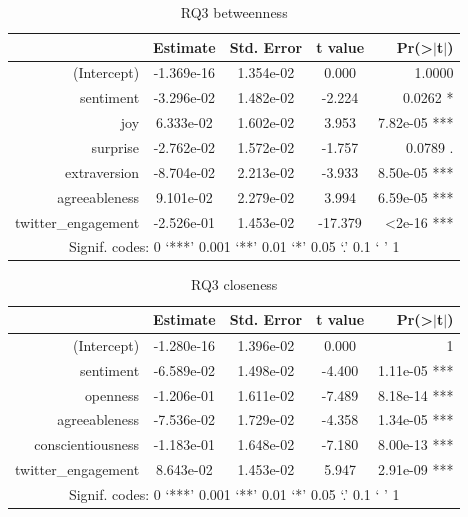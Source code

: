 \documentclass[bsc,frontabs,twoside,singlespacing,parskip,deptreport]{infthesis}
\begin{document}
\begin{table}[]
\centering
\caption{RQ3 betweenness}
\label{tab:rq3-betweenness}
\begin{tabular}{rcccr}
\hline
                    & Estimate & Std. Error     & t value & Pr(\textgreater{}$\rvert$t$\rvert$) \\ \hline
(Intercept)         & -1.369e-16    & 1.354e-02 & 0.000   & 1.0000                              \\
sentiment           & -3.296e-02    & 1.482e-02 & -2.224  & 0.0262 *                            \\
joy                 & 6.333e-02     & 1.602e-02 & 3.953   & 7.82e-05 ***                        \\
surprise            & -2.762e-02    & 1.572e-02 & -1.757  & 0.0789 .                            \\
extraversion        & -8.704e-02    & 2.213e-02 & -3.933  & 8.50e-05 ***                        \\
agreeableness       & 9.101e-02     & 2.279e-02 & 3.994   & 6.59e-05 ***                        \\
twitter\_engagement & -2.526e-01    & 1.453e-02 & -17.379 & \textless 2e-16 ***                 \\ \hline
\multicolumn{5}{c}{Signif. codes: 0 ‘***’ 0.001 ‘**’ 0.01 ‘*’ 0.05 ‘.’ 0.1 ‘ ’ 1}               \\ \hline
\end{tabular}
\end{table}

\begin{table}[]
\centering
\caption{RQ3 closeness}
\label{tab:rq3-closeness}
\begin{tabular}{rcccr}
\hline
                    & Estimate & Std. Error     & t value & Pr(\textgreater{}$\rvert$t$\rvert$) \\ \hline
(Intercept)         & -1.280e-16    & 1.396e-02 & 0.000   & 1                                   \\
sentiment           & -6.589e-02    & 1.498e-02 & -4.400  & 1.11e-05 ***                        \\
openness            & -1.206e-01    & 1.611e-02 & -7.489  & 8.18e-14 ***                        \\
agreeableness       & -7.536e-02    & 1.729e-02 & -4.358  & 1.34e-05 ***                        \\
conscientiousness   & -1.183e-01    & 1.648e-02 & -7.180  & 8.00e-13 ***                        \\
twitter\_engagement & 8.643e-02     & 1.453e-02 & 5.947   & 2.91e-09 ***                        \\ \hline
\multicolumn{5}{c}{Signif. codes:  0 ‘***’ 0.001 ‘**’ 0.01 ‘*’ 0.05 ‘.’ 0.1 ‘ ’ 1}              \\ \hline
\end{tabular}
\end{table}
\end{document}
